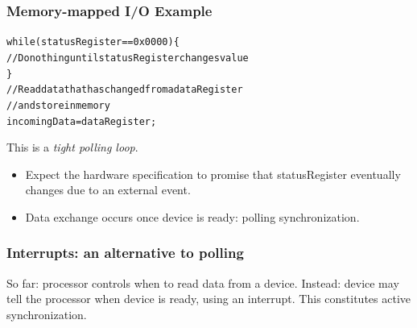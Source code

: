 \begin{frame}
\frametitle{Memory-mapped I/O Example}

\small
\begin{changemargin}{1em}
\begin{alltt}
 while (\alert{statusRegister} == 0x0000) \{\\
 \qquad // Do nothing until statusRegister changes value\\
 \}\\
 //  Read data that has changed from a dataRegister\\
 //  and store in memory\\
 incomingData = \alert{dataRegister};\\
\end{alltt}
\end{changemargin}

\begin{changemargin}{1.5cm}
This is a \emph{tight polling loop}.\\[1em]
\begin{itemize}
\item Expect the hardware specification to promise that statusRegister eventually changes 
due to an external event.
\item Data exchange occurs once device is ready: \alert{polling synchronization}.
\end{itemize}
\end{changemargin}


\end{frame}

\begin{frame}
\frametitle{Interrupts: an alternative to polling}

\large
\begin{changemargin}{1cm}
So far: processor controls when to read data from a device.\vfill
Instead: device may tell the processor when device is ready,
using an \alert{interrupt}.\vfill
This constitutes \alert{active synchronization}.
\end{changemargin}

\end{frame}

